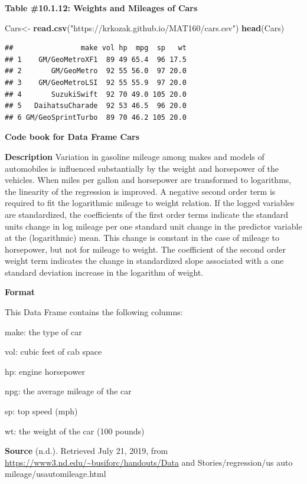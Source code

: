 \documentclass[]{book}
\newenvironment{Shaded}{\begin{snugshade}}{\end{snugshade}}
\newcommand{\KeywordTok}[1]{\textcolor[rgb]{0.13,0.29,0.53}{\textbf{#1}}}
\newcommand{\NormalTok}[1]{#1}
\newcommand{\StringTok}[1]{\textcolor[rgb]{0.31,0.60,0.02}{#1}}
\begin{document}
\textbf{Table \#10.1.12: Weights and Mileages of Cars}

\begin{Shaded}
\begin{Highlighting}[]
\NormalTok{Cars<-}\StringTok{ }\KeywordTok{read.csv}\NormalTok{(}\StringTok{"https://krkozak.github.io/MAT160/cars.csv"}\NormalTok{)}
\KeywordTok{head}\NormalTok{(Cars)}
\end{Highlighting}
\end{Shaded}

\begin{verbatim}
##                make vol hp  mpg  sp   wt
## 1    GM/GeoMetroXF1  89 49 65.4  96 17.5
## 2       GM/GeoMetro  92 55 56.0  97 20.0
## 3    GM/GeoMetroLSI  92 55 55.9  97 20.0
## 4       SuzukiSwift  92 70 49.0 105 20.0
## 5   DaihatsuCharade  92 53 46.5  96 20.0
## 6 GM/GeoSprintTurbo  89 70 46.2 105 20.0
\end{verbatim}

\textbf{Code book for Data Frame Cars}

\textbf{Description}
Variation in gasoline mileage among makes and models of automobiles is influenced substantially by the weight and horsepower of the vehicles. When miles per gallon and horsepower are transformed to logarithms, the linearity of the regression is improved. A negative second order term is required to fit the logarithmic mileage to weight relation. If the logged variables are standardized, the coefficients of the first order terms indicate the standard units change in log mileage per one standard unit change in the predictor variable at the (logarithmic) mean. This change is constant in the case of mileage to horsepower, but not for mileage to weight. The coefficient of the second order weight term indicates the change in standardized slope associated with a one standard deviation increase in the logarithm of weight.

\textbf{Format}

This Data Frame contains the following columns:

make: the type of car

vol: cubic feet of cab space

hp: engine horsepower

npg: the average mileage of the car

sp: top speed (mph)

wt: the weight of the car (100 pounds)

\textbf{Source}
(n.d.). Retrieved July 21, 2019, from \url{https://www3.nd.edu/~busiforc/handouts/Data} and Stories/regression/us auto mileage/usautomileage.html
\end{document}
